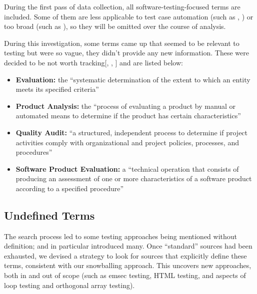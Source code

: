 During the first pass of data collection, all software-testing-focused terms
are included. Some of them are less applicable to test case automation
\ifnotpaper(such as , ) \fi or too
broad (such as \fi), so they
will be omitted over the course of analysis.

\ifnotpaper
    During this investigation, some terms came up that seemed to be relevant to
    testing but were so vague, they didn't provide any new information. These were
    decided to be not worth tracking[, ,
        ] and are listed below:

    \begin{itemize}
        \item \textbf{Evaluation:} the ``systematic determination of the extent
              to which an entity meets its specified criteria''
              \citep[p.~167]{IEEE2017}
        \item \textbf{Product Analysis:} the ``process of evaluating a product by
              manual or automated means to determine if the product has certain
              characteristics'' \citep[p.~343]{IEEE2017}
        \item \textbf{Quality Audit:} ``a structured, independent process to
              determine if project activities comply with organizational and
              project policies, processes, and procedures'' \citep[p.~361]{IEEE2017}
        \item \textbf{Software Product Evaluation:} a ``technical operation that
              consists of producing an assessment of one or more characteristics
              of a software product according to a specified procedure''
              \citep[p.~424]{IEEE2017}
    \end{itemize}
\fi
\subsection{Undefined Terms}
\label{undef-terms}

The search process led to some testing approaches being
mentioned without definition;
\citep{IEEE2022} and \citep{Firesmith2015} in particular introduced many.
Once ``standard'' sources had been exhausted, we devised a strategy to
look for sources that explicitly define these terms, consistent with
our snowballing approach. This uncovers new approaches, both in and out of
scope (such as \acf{emsec} testing, HTML testing, and aspects of loop testing and
orthogonal array testing).


